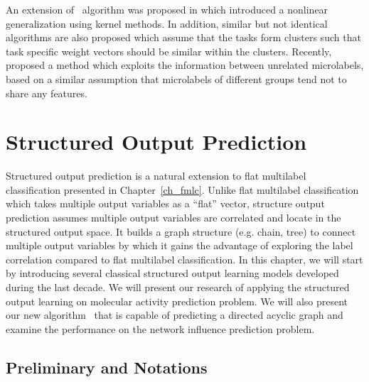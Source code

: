 {An extension of \mtl\ algorithm was proposed in \citep{Argyriou08convex} which introduced a nonlinear generalization using kernel methods.
In addition, similar but not identical algorithms \citep{Argyriou08an,Jacob09cluster} are also proposed which assume that the tasks form clusters such that task specific weight vectors should be similar within the clusters.
Recently, \citet{Paredes12exploit} proposed a method which exploits the information between unrelated microlabels, based on a similar assumption that microlabels of different groups tend not to share any features.




%
%
\chapter{Structured Output Prediction} \label{ch_sop}

Structured output prediction is a natural extension to flat multilabel classification presented in Chapter~\ref{ch_fmlc}.
Unlike flat multilabel classification which takes multiple output variables as a ``flat'' vector, structure output prediction assumes multiple output variables are correlated and locate in the structured output space.
It builds a graph structure (e.g. chain, tree) to connect multiple output variables by which it gains the advantage of exploring the label correlation compared to flat multilabel classification.
In this chapter, we will start by introducing several classical structured output learning models developed during the last decade.
We will present our research of applying the structured output learning on molecular activity prediction problem.
We will also present our new algorithm \spin\ that is capable of predicting a directed acyclic graph and examine the performance on the network influence prediction problem.



%
%
\section{Preliminary and Notations}

}
